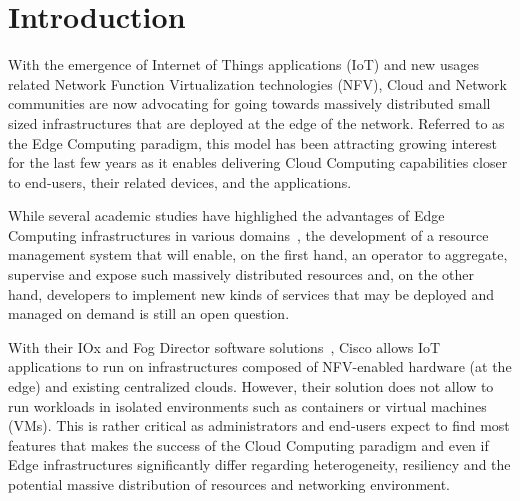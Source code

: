 
\section{Introduction}
\label{sec:intro}


With the emergence of Internet of Things applications (IoT) and new
usages related Network Function
Virtualization technologies (NFV), Cloud and Network communities are now advocating
for going towards massively distributed small sized infrastructures
that are deployed at the edge of the network.
%
Referred to as the Edge Computing paradigm, this model has been attracting
growing interest for the last few years as it enables delivering Cloud
Computing capabilities closer to end-users, their related devices, and the applications.
%

While several academic studies have highlighed the advantages of Edge
Computing infrastructures in various
domains~\cite{bonomi2012fog,zhang2015cloud,yi2015fog,shi2016edge,satyanarayanan2017emergence},
the development of
a resource management system that will enable, on the first hand,
an operator to aggregate, supervise and expose such massively
distributed resources and, on the other hand, developers to implement
new kinds of services that may be deployed and managed on demand is
still an open question.

With their IOx and Fog Director software
solutions~\cite{bonomi2012fog}, Cisco allows IoT applications to run
on infrastructures composed of NFV-enabled hardware (at the edge) and
existing centralized clouds. However, their solution does not allow to
run workloads in isolated environments such as containers or virtual
machines (VMs). 
%
This is rather critical as administrators and end-users expect to find
most features that makes the success of the Cloud Computing paradigm
and even if Edge infrastructures significantly differ regarding
heterogeneity, resiliency and the potential massive distribution of
resources and networking environment.

